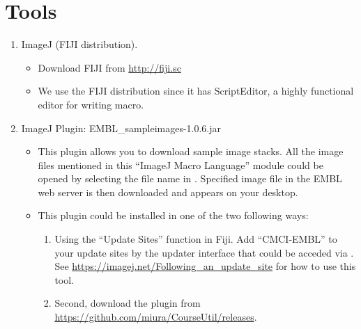 \section{Tools}
\label{sec:tools}

\begin{enumerate}
  \item ImageJ (FIJI distribution).

\begin{itemize}
    \item Download FIJI from \url{http://fiji.sc}
    \item We use the FIJI distribution since it has ScriptEditor, a highly functional editor for writing macro. 
  
\end{itemize}
  \item ImageJ Plugin: EMBL\_sampleimages-1.0.6.jar

\begin{itemize}
     \item This plugin allows you to download sample image stacks. All the image files mentioned in this ``ImageJ Macro Language'' module could be opened by selecting the file name in . Specified image file in the EMBL web server is then downloaded and appears on your desktop.
    \item This plugin could be installed in one of the two following ways:
    \begin{enumerate}
    \item Using the ``Update Sites'' function in Fiji. Add ``CMCI-EMBL'' to your update sites by the updater interface that could be acceded via . See \url{https://imagej.net/Following_an_update_site} for how to use this tool.         
    \item Second, download the plugin from \url{https://github.com/miura/CourseUtil/releases}. 
    \end{enumerate}
\end{itemize}

\end{enumerate}
 
\newpage